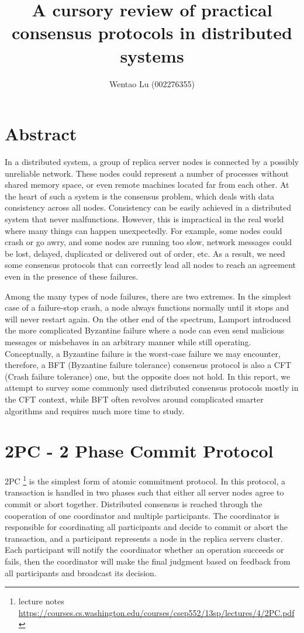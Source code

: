 \documentclass[11pt]{article}
\title{A cursory review of practical consensus protocols in distributed systems}
\author{Wentao Lu (002276355)}
\date{}
\begin{document}
  \maketitle

  \section{Abstract}
    In a distributed system, a group of replica server nodes is connected by a possibly unreliable network. These nodes could represent a number of processes without shared memory space, or even remote machines located far from each other. At the heart of such a system is the consensus problem, which deals with data consistency across all nodes. Consistency can be easily achieved in a distributed system that never malfunctions. However, this is impractical in the real world where many things can happen unexpectedly. For example, some nodes could crash or go awry, and some nodes are running too slow, network messages could be lost, delayed, duplicated or delivered out of order, etc. As a result, we need some consensus protocols that can correctly lead all nodes to reach an agreement even in the presence of these failures.

    Among the many types of node failures, there are two extremes. In the simplest case of a failure-stop crash, a node always functions normally until it stops and will never restart again. On the other end of the spectrum, Lamport introduced the more complicated Byzantine failure where a node can even send malicious messages or misbehaves in an arbitrary manner while still operating. Conceptually, a Byzantine failure is the worst-case failure we may encounter, therefore, a \small{BFT} \normalsize (Byzantine failure tolerance) consensus protocol is also a \small{CFT} \normalsize (Crash failure tolerance) one, but the opposite does not hold. In this report, we attempt to survey some commonly used distributed consensus protocols mostly in the \small{CFT} \normalsize context, while \small{BFT} \normalsize often revolves around complicated smarter algorithms and requires much more time to study.

  \section{2PC - 2 Phase Commit Protocol}
    \small{2PC} \normalsize\footnote{\label{}lecture notes \url{https://courses.cs.washington.edu/courses/csep552/13sp/lectures/4/2PC.pdf}} is the simplest form of atomic commitment protocol. In this protocol, a transaction is handled in two phases such that either all server nodes agree to commit or abort together. Distributed consensus is reached through the cooperation of one coordinator and multiple participants. The coordinator is responsible for coordinating all participants and decide to commit or abort the transaction, and a participant represents a node in the replica servers cluster. Each participant will notify the coordinator whether an operation succeeds or fails, then the coordinator will make the final judgment based on feedback from all participants and broadcast its decision.\\
\end{document}
